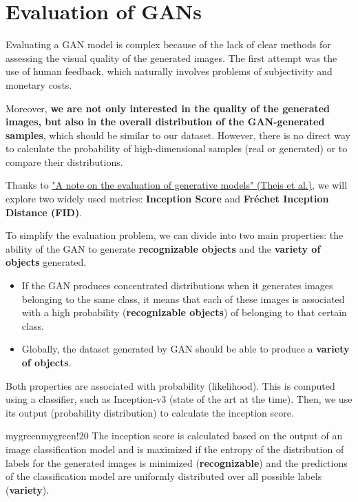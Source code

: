 \section{Evaluation of GANs}

Evaluating a GAN model is complex because of the lack of clear methods for assessing the visual quality of the generated images. The first attempt was the use of human feedback, which naturally involves problems of subjectivity and monetary costs.

Moreover, \textbf{we are not only interested in the quality of the generated images, but also in the overall distribution of the GAN-generated samples}, which should be similar to our dataset. However, there is no direct way to calculate the probability of high-dimensional samples (real or generated) or to compare their distributions.

Thanks to \href{https://arxiv.org/pdf/1511.01844}{"A note on the evaluation of generative models" (Theis et al.)}, we will explore two widely used metrics: \textbf{Inception Score} and \textbf{Fréchet Inception Distance (FID)}.

To simplify the evaluation problem, we can divide into two main properties: the ability of the GAN to generate \textbf{recognizable objects} and the \textbf{variety of objects} generated.
\begin{itemize}
    \item If the GAN produces concentrated distributions when it generates images belonging to the same class, it means that each of these images is associated with a high probability (\textbf{recognizable objects}) of belonging to that certain class.
    \item Globally, the dataset generated by GAN should be able to produce a \textbf{variety of objects}.
\end{itemize}

Both properties are associated with probability (likelihood). This is computed using a classifier, such as Inception-v3 (state of the art at the time). Then, we use its output (probability distribution) to calculate the inception score.

\begin{remark}{mygreen}{mygreen!20}
The inception score is calculated based on the output of an image classification model and is maximized if the entropy of the distribution of labels for the generated images is minimized (\textbf{recognizable}) and the predictions of the classification model are uniformly distributed over all possible labels (\textbf{variety}).
\end{remark}


